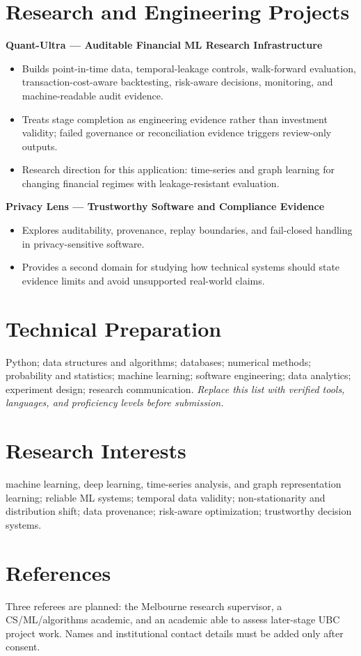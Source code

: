 \documentclass[11pt]{article}
\begin{document}
\section*{Research and Engineering Projects}
\textbf{Quant-Ultra --- Auditable Financial ML Research Infrastructure}
\begin{itemize}
\item Builds point-in-time data, temporal-leakage controls, walk-forward evaluation, transaction-cost-aware backtesting, risk-aware decisions, monitoring, and machine-readable audit evidence.
\item Treats stage completion as engineering evidence rather than investment validity; failed governance or reconciliation evidence triggers review-only outputs.
\item Research direction for this application: time-series and graph learning for changing financial regimes with leakage-resistant evaluation.
\end{itemize}

\begin{samepage}
\textbf{Privacy Lens --- Trustworthy Software and Compliance Evidence}
\begin{itemize}
\item Explores auditability, provenance, replay boundaries, and fail-closed handling in privacy-sensitive software.
\item Provides a second domain for studying how technical systems should state evidence limits and avoid unsupported real-world claims.
\end{itemize}
\end{samepage}

\section*{Technical Preparation}
Python; data structures and algorithms; databases; numerical methods; probability and statistics; machine learning; software engineering; data analytics; experiment design; research communication. \textit{Replace this list with verified tools, languages, and proficiency levels before submission.}

\section*{Research Interests}
machine learning, deep learning, time-series analysis, and graph representation learning; reliable ML systems; temporal data validity; non-stationarity and distribution shift; data provenance; risk-aware optimization; trustworthy decision systems.

\section*{References}
Three referees are planned: the Melbourne research supervisor, a CS/ML/algorithms academic, and an academic able to assess later-stage UBC project work. Names and institutional contact details must be added only after consent.
\end{document}

